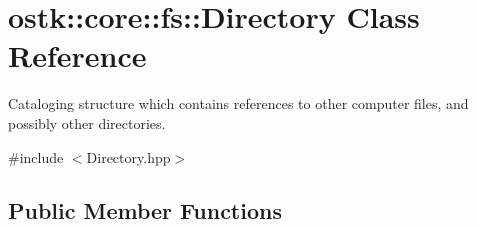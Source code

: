 \hypertarget{classostk_1_1core_1_1fs_1_1_directory}{}\section{ostk\+:\+:core\+:\+:fs\+:\+:Directory Class Reference}
\label{classostk_1_1core_1_1fs_1_1_directory}


Cataloging structure which contains references to other computer files, and possibly other directories.  




{\ttfamily \#include $<$Directory.\+hpp$>$}

\subsection*{Public Member Functions}
